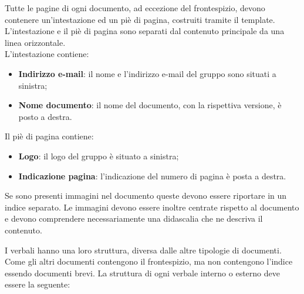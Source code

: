 
				Tutte le pagine di ogni documento, ad eccezione del frontespizio, devono contenere
				un'intestazione ed un piè di pagina, costruiti tramite il template. L'intestazione e 
				il piè di pagina sono separati dal contenuto principale da una linea orizzontale. \\
				L'intestazione contiene:

                    \begin{itemize}
                        \item \textbf{Indirizzo e-mail}: il nome e l'indirizzo e-mail del gruppo sono
                        situati a sinistra;
                        \item \textbf{Nome documento}: il nome del documento, con la rispettiva versione,
                        è posto a destra.
                    \end{itemize}

				Il piè di pagina contiene:

                    \begin{itemize}
                        \item \textbf{Logo}: il logo del gruppo è situato a sinistra;
                        \item \textbf{Indicazione pagina}: l'indicazione del numero di pagina è posta
                        a destra.
                    \end{itemize}


				Se sono presenti immagini nel documento queste devono essere riportare in un indice
				separato. 
				Le immagini devono essere inoltre centrate rispetto al documento e devono comprendere 
				necessariamente una didascalia che ne descriva il contenuto. 


				I verbali hanno una loro struttura, diversa dalle altre tipologie di documenti.
				Come gli altri documenti contengono il frontespizio, ma non contengono l'indice essendo 
				documenti brevi. 
				La struttura di ogni verbale interno o esterno deve essere la seguente:

